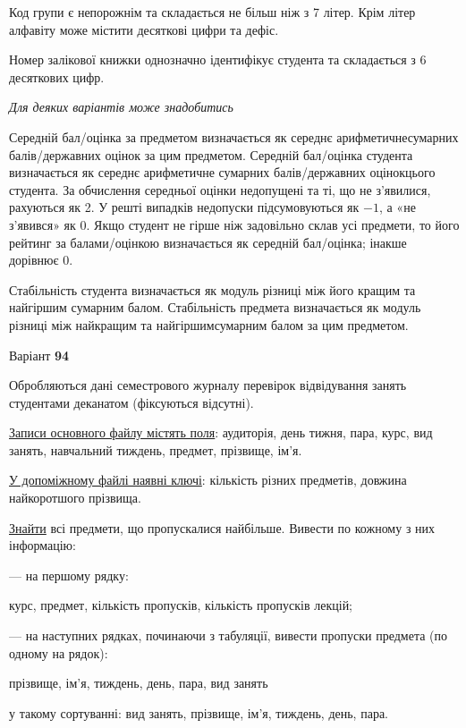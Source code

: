 \documentclass[11pt, ukrainian]{article}
\begin{document}
Код групи є непорожнім та складається не більш ніж з 7 літер. 
Крім літер алфавіту може містити десяткові цифри та дефіс.


Номер залікової книжки однозначно ідентифікує студента та складається з 6 десяткових цифр. 

\bigskip\textit{Для деяких варіантів може знадобитись}

Середній бал/оцінка за предметом визначається як середнє арифметичнесумарних балів/державних оцінок за цим предметом. 
Середній бал/оцінка студента визначається як середнє арифметичне сумарних балів/державних оцінокцього студента. 
За обчислення середньої оцінки недопущені та ті, що не з’явилися, рахуються як 2.
У решті випадків недопуски підсумовуються як $-1$, а «не з’явився» як 0.
Якщо студент не гірше ніж задовільно склав усі предмети, 
то його рейтинг за балами/оцінкою визначається як середній бал/оцінка; інакше дорівнює 0.

Стабільність студента визначається як модуль різниці між його кращим та найгіршим сумарним балом.
Стабільність предмета визначається як модуль різниці між найкращим та найгіршимсумарним балом за цим предметом.






\par
\newpage
{\center Варіант  \No \textbf { 94 }\par}
\bigskip
Обробляються дані семестрового журналу перевірок відвідування занять студентами деканатом (фіксуються відсутні). 

\underline{Записи основного файлу містять поля}: аудиторія, день тижня, пара, курс, вид занять, навчальний тиждень, предмет, прізвище, ім’я.

\underline{У допоміжному файлі наявні ключі}: кількість різних предметів, довжина найкоротшого прізвища.

\underline{Знайти} всі предмети, що пропускалися найбільше. Вивести по кожному з них інформацію:\par
{\noindent}--- на першому рядку:\par
курс, предмет, кількість пропусків, кількість пропусків лекцій;

{\noindent}--- на наступних рядках, починаючи з табуляції, вивести пропуски предмета (по одному на рядок):\par
прізвище, ім’я, тиждень, день, пара, вид занять

{\noindent}у такому сортуванні: вид занять, прізвище, ім’я, тиждень, день, пара.
\end{document}
